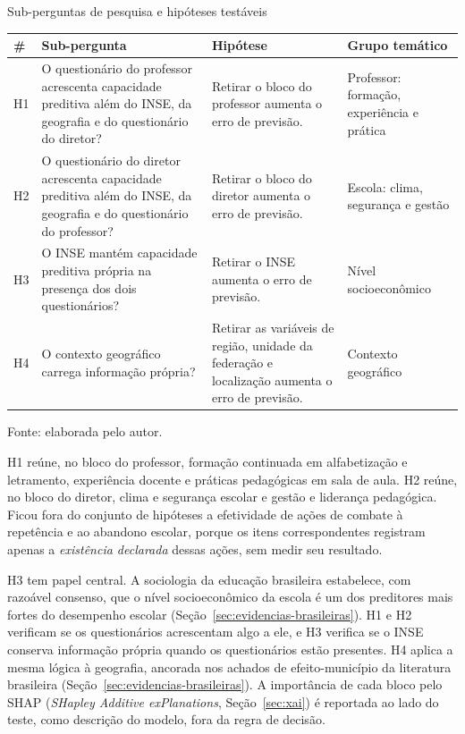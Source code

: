 \begin{quadro}[H]
    \centering
    \footnotesize
    \caption{Sub-perguntas de pesquisa e hipóteses testáveis}
    \begin{tabular}{|P{0.5cm}|P{3.6cm}|P{5.3cm}|P{2.6cm}|}
        \hline
        \textbf{\#} & \textbf{Sub-pergunta} & \textbf{Hipótese} & \textbf{Grupo temático} \\
        \hline
        H1 & O questionário do professor acrescenta capacidade preditiva além
        do INSE, da geografia e do questionário do diretor? & Retirar o bloco
        do professor aumenta o erro de previsão. & Professor: formação,
        experiência e prática \\ \hline
        H2 & O questionário do diretor acrescenta capacidade preditiva além do
        INSE, da geografia e do questionário do professor? & Retirar o bloco
        do diretor aumenta o erro de previsão. & Escola: clima, segurança e
        gestão \\ \hline
        H3 & O INSE mantém capacidade preditiva própria na presença dos dois
        questionários? & Retirar o INSE aumenta o erro de previsão. & Nível
        socioeconômico \\ \hline
        H4 & O contexto geográfico carrega informação própria? & Retirar as
        variáveis de região, unidade da federação e localização aumenta o
        erro de previsão. & Contexto geográfico \\
        \hline
    \end{tabular}
    \vspace{0.1cm}
    \begin{flushleft}
    {\footnotesize Fonte: elaborada pelo autor.}
    \end{flushleft}
    \label{quad:hipoteses}
\end{quadro}

H1 reúne, no bloco do professor, formação continuada em
alfabetização e letramento, experiência docente e práticas pedagógicas em
sala de aula. H2 reúne, no bloco do diretor, clima e segurança escolar e
gestão e liderança pedagógica. Ficou fora do conjunto de hipóteses a
efetividade de ações de combate à repetência e ao abandono escolar, porque
os itens correspondentes registram apenas a \emph{existência declarada}
dessas ações, sem medir seu resultado.

H3 tem papel central. A sociologia da educação brasileira estabelece, com
razoável consenso, que o nível socioeconômico da escola é um dos preditores
mais fortes do desempenho escolar
(Seção~\ref{sec:evidencias-brasileiras}). H1 e H2 verificam se os
questionários acrescentam algo a ele, e H3 verifica se o INSE conserva
informação própria quando os questionários estão presentes. H4 aplica a
mesma lógica à geografia, ancorada nos achados de efeito-município da
literatura brasileira (Seção~\ref{sec:evidencias-brasileiras}). A
importância de cada bloco pelo SHAP (\textit{SHapley Additive exPlanations},
Seção~\ref{sec:xai}) é reportada ao
lado do teste, como descrição do modelo, fora da regra de decisão.

